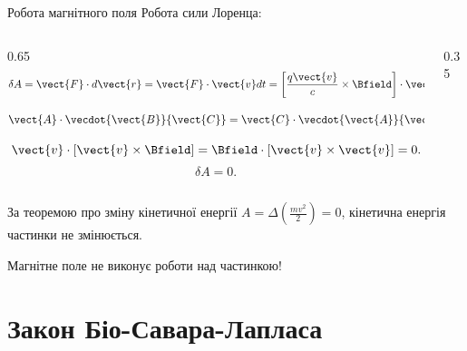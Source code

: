 \documentclass{beamer}
\begin{document}
\begin{frame}{Робота магнітного поля}{}
	Робота сили Лоренца:
	\begin{columns}
		\begin{column}{0.65\linewidth}
			\begin{equation*}
				\delta A = \vect{F}\cdot d\vect{r} = \vect{F}\cdot\vect{v}dt =
				\left[\frac{q \vect{v}}{c}\times\Bfield\right] \cdot\vect{v}dt.
			\end{equation*}
			\begin{block}{}
				\begin{equation*}
					\vect{A}\cdot\vecdot{\vect{B}}{\vect{C}} =
					\vect{C}\cdot\vecdot{\vect{A}}{\vect{B}}.
				\end{equation*}
			\end{block}
			\begin{equation*}
				\vect{v}\cdot\left[\vect{v}\times\Bfield\right] =
				\Bfield\cdot\left[\vect{v}\times\vect{v}\right] = 0.
			\end{equation*}
			\begin{equation*}
				\delta A = 0.
			\end{equation*}
		\end{column}
		\begin{column}{0.35\linewidth}\centering
			
		\end{column}
	\end{columns}
	\begin{block}{}
		За теоремою про зміну кінетичної енергії $A = \Delta\left(\frac{mv^2}{2}\right) =
			0$, кінетична енергія частинки не змінюється.
	\end{block}
	\begin{alertblock}{}\centering
		Магнітне поле не виконує роботи над частинкою!
	\end{alertblock}
\end{frame}



\section{Закон Біо-Савара-Лапласа}
\end{document}
